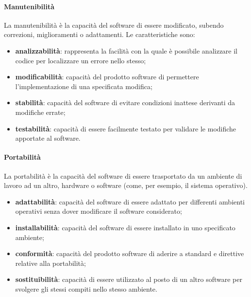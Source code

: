 \paragraph{Manutenibilità}
La manutenibilità è la capacità del software di essere modificato, subendo correzioni, miglioramenti o adattamenti. Le caratteristiche sono:
\begin{itemize}
\item \textbf{analizzabilità}: rappresenta la facilità con la quale è possibile analizzare il codice per localizzare un errore nello stesso;
\item \textbf{modificabilità}: capacità del prodotto software di permettere l'implementazione di una specificata modifica;
\item \textbf{stabilità}: capacità del software di evitare condizioni inattese derivanti da modifiche errate;
\item \textbf{testabilità}: capacità di essere facilmente testato per validare le modifiche apportate al software.
\end{itemize}

\paragraph{Portabilità}
La portabilità è la capacità del software di essere trasportato da un ambiente di lavoro ad un altro, hardware o software (come, per esempio, il sistema operativo).
\begin{itemize}
\item \textbf{adattabilità}: capacità del software di essere adattato per differenti ambienti operativi senza dover modificare il software considerato;
\item \textbf{installabilità}: capacità del software di essere installato in uno specificato ambiente;
\item \textbf{conformità}: capacità del prodotto software di aderire a standard e direttive relative alla portabilità;
\item \textbf{sostituibilità}: capacità di essere utilizzato al posto di un altro software per svolgere gli stessi compiti nello stesso ambiente.
\end{itemize}

